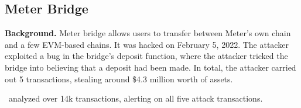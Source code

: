 \subsection{Meter Bridge}
\textbf{Background.} Meter bridge allows users to transfer between Meter's own chain and a few EVM-based chains. It was hacked on February 5, 2022. The attacker exploited a bug in the bridge's deposit function, where the attacker tricked the bridge into believing that a deposit had been made. In total, the attacker carried out 5 transactions, stealing around \$4.3 million worth of assets.

 \offlinetool~analyzed over 14k transactions, alerting on all five attack transactions.


